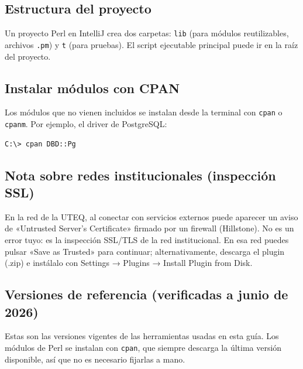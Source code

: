 \documentclass[11pt]{article}
\begin{document}
\subsection{Estructura del proyecto}
Un proyecto Perl en IntelliJ crea dos carpetas: \texttt{lib} (para módulos reutilizables, archivos \texttt{.pm}) y \texttt{t} (para pruebas). El script ejecutable principal puede ir en la raíz del proyecto.

\subsection{Instalar módulos con CPAN}
Los módulos que no vienen incluidos se instalan desde la terminal con \texttt{cpan} o \texttt{cpanm}. Por ejemplo, el driver de PostgreSQL:

\begin{cajacodigo}
\begin{lstlisting}[style=markup]
C:\> cpan DBD::Pg
\end{lstlisting}
\end{cajacodigo}
\vspace{2pt}
\subsection{Nota sobre redes institucionales (inspección SSL)}
En la red de la UTEQ, al conectar con servicios externos puede aparecer un aviso de «Untrusted Server's Certificate» firmado por un firewall (Hillstone). No es un error tuyo: es la inspección SSL/TLS de la red institucional. En esa red puedes pulsar «Save as Trusted» para continuar; alternativamente, descarga el plugin (.zip) e instálalo con Settings → Plugins → Install Plugin from Disk.

\subsection{Versiones de referencia (verificadas a junio de 2026)}
Estas son las versiones vigentes de las herramientas usadas en esta guía. Los módulos de Perl se instalan con \texttt{cpan}, que siempre descarga la última versión disponible, así que no es necesario fijarlas a mano.
\end{document}
